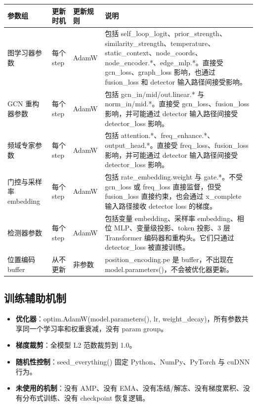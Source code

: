 \documentclass[11pt,a4paper]{ctexart}
\newcommand{\code}[1]{{\ttfamily\small #1}}
\begin{document}
\begin{longtable}{L{3.1cm}L{2.4cm}L{2.4cm}L{5.6cm}}
\toprule
参数组 & 更新时机 & 更新规则 & 说明 \\
\midrule
\endhead
图学习器参数 & 每个 step & AdamW & 包括 \code{self\_loop\_logit}、\code{prior\_strength}、\code{similarity\_strength}、\code{temperature}、\code{static\_context}、\code{node\_coords}、\code{node\_encoder.*}、\code{edge\_mlp.*}。直接受 \code{gcn\_loss}、\code{graph\_loss} 影响，也通过 \code{fusion\_loss} 和 detector 输入路径间接受影响。 \\
GCN 重构器参数 & 每个 step & AdamW & 包括 \code{gcn\_in/mid/out.linear.*} 与 \code{norm\_in/mid.*}。直接受 \code{gcn\_loss}、\code{fusion\_loss} 影响，并可能通过 detector 输入路径间接受 \code{detector\_loss} 影响。 \\
频域专家参数 & 每个 step & AdamW & 包括 \code{attention.*}、\code{freq\_enhance.*}、\code{output\_head.*}。直接受 \code{freq\_loss}、\code{fusion\_loss} 影响，并可能通过 detector 输入路径间接受 \code{detector\_loss} 影响。 \\
门控与采样率 embedding & 每个 step & AdamW & 包括 \code{rate\_embedding.weight} 与 \code{gate.*}。不受 \code{gcn\_loss} 或 \code{freq\_loss} 直接监督，但受 \code{fusion\_loss} 直接约束，也会通过 \code{x\_complete} 输入路径接收 detector loss 的梯度。 \\
检测器参数 & 每个 step & AdamW & 包括变量 embedding、采样率 embedding、相位 MLP、变量级投影、token 投影、3 层 Transformer 编码器和重构头。它们只通过 \code{detector\_loss} 被直接训练。 \\
位置编码 buffer & 从不更新 & 非参数 & \code{position\_encoding.pe} 是 buffer，不出现在 \code{model.parameters()}，不会被优化器更新。 \\
\bottomrule
\end{longtable}

\subsection{训练辅助机制}

\begin{itemize}
  \item \textbf{优化器}：\code{optim.AdamW(model.parameters(), lr, weight\_decay)}，所有参数共享同一个学习率和权重衰减，没有 param group。
  \item \textbf{梯度裁剪}：全模型 L2 范数裁剪到 1.0。
  \item \textbf{随机性控制}：\code{seed\_everything()} 固定 Python、NumPy、PyTorch 与 cuDNN 行为。
  \item \textbf{未使用的机制}：没有 AMP、没有 EMA、没有冻结/解冻、没有梯度累积、没有分布式训练、没有 checkpoint 恢复逻辑。
\end{itemize}
\end{document}
